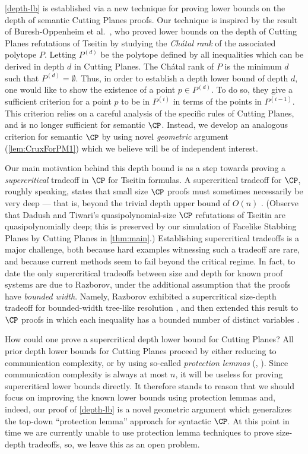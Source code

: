 \autoref{depth-lb} is established via a new technique for proving lower bounds on the depth of semantic Cutting Planes proofs. Our technique is inspired by the result of Buresh-Oppenheim et al.~\cite{BGHMP06}, who proved lower bounds on the depth of Cutting Planes refutations of Tseitin by studying the \emph{Ch\'{a}tal rank} of the associated polytope $P$. Letting $P^{(d)}$ be the polytope %
defined by %
all inequalities which can be derived in depth $d$ in Cutting Planes. The Ch\'{a}tal rank of $P$ is the minimum $d$ such that $P^{(d)}=\emptyset$. Thus, in order to establish a depth lower bound of depth $d$, one would like to show the existence of a point $p \in P^{(d)}$. To do so, they give a sufficient criterion for a point $p$ to be in $P^{(i)}$ in terms of the points in $P^{(i-1)}$. This criterion relies on a careful analysis of the specific rules of Cutting Planes, and is no longer sufficient for semantic $\CP$. Instead, we develop an analogous criterion for semantic $\CP$ by using novel \emph{geometric} argument (\autoref{lem:CruxForPM1}) which we believe will be of independent interest. 


%
Our main motivation behind this depth bound is as a step towards proving a \emph{supercritical} tradeoff in $\CP$ for Tseitin formulas.
A supercritical tradeoff for $\CP$, roughly speaking, states that small size $\CP$ proofs must sometimes necessarily be very deep --- that is, beyond the trivial depth upper bound of $O(n)$ \cite{Razborov16,BerkholzN20}.
(Observe that Dadush and Tiwari's quasipolynomial-size $\CP$ refutations of Tseitin are quasipolynomially deep; this is preserved by our simulation of Facelike Stabbing Planes by Cutting Planes in \autoref{thm:main}.)
Establishing supercritical tradeoffs is a major challenge, both because
hard examples witnessing such a tradeoff are rare, and because current methods seem to fail beyond the critical regime.
In fact, to date the only supercritical tradeoffs between size and depth for known proof systems are due to Razborov, under the additional assumption that the proofs have \emph{bounded width}.
Namely, Razborov exhibited a supercritical size-depth tradeoff for
%
bounded-width    %
tree-like resolution \cite{Razborov16}, and then extended this result to $\CP$ proofs in which each inequality has a bounded number of distinct variables \cite{Razborov17}.

How could one prove a supercritical depth lower bound for Cutting Planes?
All prior depth lower bounds for Cutting Planes proceed by either reducing to communication complexity, or by using so-called \emph{protection lemmas} (\eg, \cite{BGHMP06}).
Since communication complexity is always at most $n$, it will be useless for proving supercritical lower bounds directly.
It therefore stands to reason that we should focus on improving the known lower bounds using protection lemmas and, indeed, our proof of \autoref{depth-lb} is a novel geometric argument which generalizes the top-down ``protection lemma'' approach \cite{BGHMP06} for syntactic $\CP$.
At this point in time we are currently unable to use protection lemma techniques to prove size-depth tradeoffs, so, we leave this as an open problem.

